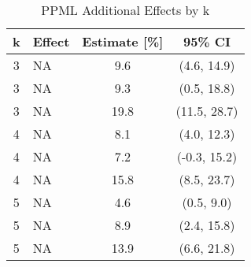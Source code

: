 \begin{table}[!ht]
\centering
\caption{PPML Additional Effects by k}
\begin{tabular}{clcc}
\hline
k & Effect & Estimate [\%] & 95\% CI \\
\hline
3 & NA & 9.6 & (4.6, 14.9) \\
3 & NA & 9.3 & (0.5, 18.8) \\
3 & NA & 19.8 & (11.5, 28.7) \\
4 & NA & 8.1 & (4.0, 12.3) \\
4 & NA & 7.2 & (-0.3, 15.2) \\
4 & NA & 15.8 & (8.5, 23.7) \\
5 & NA & 4.6 & (0.5, 9.0) \\
5 & NA & 8.9 & (2.4, 15.8) \\
5 & NA & 13.9 & (6.6, 21.8) \\
\hline
\end{tabular}
\end{table}
